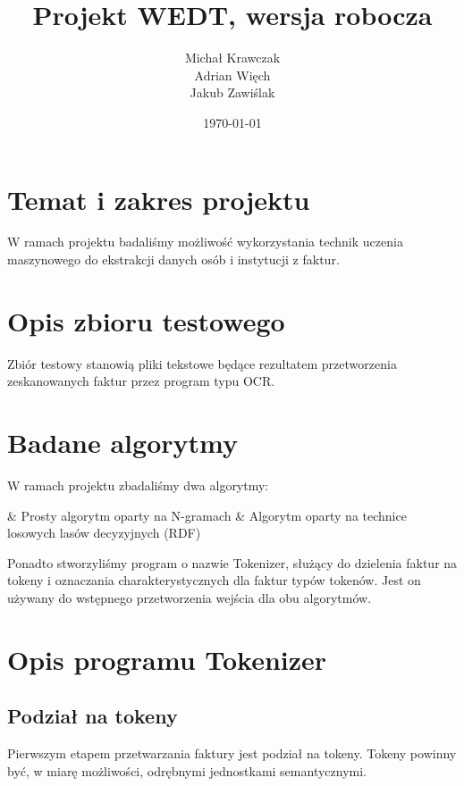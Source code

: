 \documentclass[a4paper,oneside,12pt]{article}
\title{Projekt WEDT, wersja robocza}
\author{
	Michał Krawczak \\
	Adrian Więch \\
	Jakub Zawiślak
}
\date{\today}
\begin{document}
\maketitle
\newpage
\tableofcontents
\newpage

\setlength\parindent{0pt}
\setlength{\parskip}{0.25em}

\section{Temat i zakres projektu}

W ramach projektu badaliśmy możliwość wykorzystania technik uczenia maszynowego do ekstrakcji danych osób i instytucji z faktur.

\section{Opis zbioru testowego}

Zbiór testowy stanowią pliki tekstowe będące rezultatem przetworzenia zeskanowanych faktur przez program typu OCR.

\section{Badane algorytmy}

W ramach projektu zbadaliśmy dwa algorytmy:

\begin{easylist}[itemize]
& Prosty algorytm oparty na N-gramach
& Algorytm oparty na technice losowych lasów decyzyjnych (RDF)
\end{easylist}

Ponadto stworzyliśmy program o nazwie Tokenizer, służący do dzielenia faktur na tokeny i oznaczania charakterystycznych dla faktur typów tokenów. Jest on używany do wstępnego przetworzenia wejścia dla obu algorytmów.

\section{Opis programu Tokenizer}

\subsection{Podział na tokeny}

Pierwszym etapem przetwarzania faktury jest podział na tokeny. Tokeny powinny być, w miarę możliwości, odrębnymi jednostkami semantycznymi. 
\end{document}
